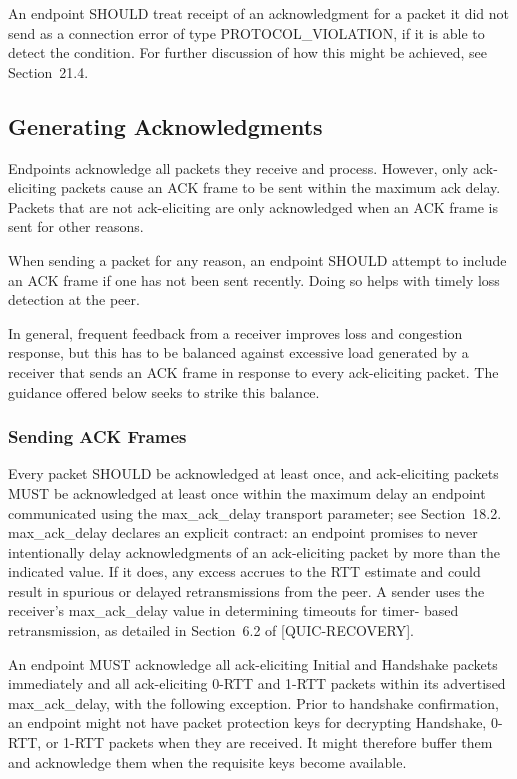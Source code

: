 \documentclass{article}
\begin{document}
An endpoint SHOULD treat receipt of an acknowledgment for a packet it did not send as a connection error of type PROTOCOL\_VIOLATION, if it is able to detect the condition.  For further discussion of how this might be achieved, see Section~21.4.

\subsection{Generating Acknowledgments}

Endpoints acknowledge all packets they receive and process.  However, only ack-eliciting packets cause an ACK frame to be sent within the maximum ack delay.  Packets that are not ack-eliciting are only acknowledged when an ACK frame is sent for other reasons.

When sending a packet for any reason, an endpoint SHOULD attempt to include an ACK frame if one has not been sent recently.  Doing so helps with timely loss detection at the peer.

In general, frequent feedback from a receiver improves loss and congestion response, but this has to be balanced against excessive load generated by a receiver that sends an ACK frame in response to every ack-eliciting packet.  The guidance offered below seeks to strike this balance.

\subsubsection{Sending ACK Frames}

Every packet SHOULD be acknowledged at least once, and ack-eliciting packets MUST be acknowledged at least once within the maximum delay an endpoint communicated using the max\_ack\_delay transport parameter; see Section~18.2.  max\_ack\_delay declares an explicit contract: an endpoint promises to never intentionally delay acknowledgments of an ack-eliciting packet by more than the indicated value.  If it does, any excess accrues to the RTT estimate and could result in spurious or delayed retransmissions from the peer.  A sender uses the receiver's max\_ack\_delay value in determining timeouts for timer- based retransmission, as detailed in Section~6.2 of [QUIC-RECOVERY].

An endpoint MUST acknowledge all ack-eliciting Initial and Handshake packets immediately and all ack-eliciting 0-RTT and 1-RTT packets within its advertised max\_ack\_delay, with the following exception. Prior to handshake confirmation, an endpoint might not have packet protection keys for decrypting Handshake, 0-RTT, or 1-RTT packets when they are received.  It might therefore buffer them and acknowledge them when the requisite keys become available.
\end{document}
